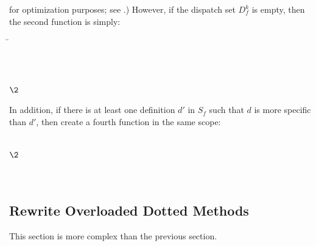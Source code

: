 for optimization purposes; see .)
However, if the dispatch set $D_f^k$ is empty, then the second function is simply:
\begin{codeexamplesize}
\begin{tabbing}
\= \\
\>                   \\
\>                  \EXP{\ldots,} \\
\>                   \\
\(\2\)
\end{tabbing}
\end{codeexamplesize}
In addition, if there is at least one definition $d'$ in $S_f$ such that $d$ is more specific than $d'$,
then create a fourth function in the same scope:
\begin{codeexamplesize}
\begin{tabbing}
 \\
\(\2\)\= \\
\> \\
\> \\
\>
\end{tabbing}
\end{codeexamplesize}

\subsection{Rewrite Overloaded Dotted Methods}

This section is more complex than the previous section.

